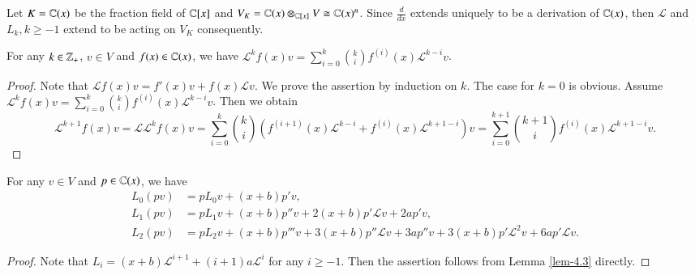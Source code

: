 \documentclass[12pt]{amsart}
\begin{document}
Let $K=\mathbb{C}(x)$ be the fraction field of $\mathbb{C}[x]$ and $V_K=\mathbb{C}(x)\otimes_{\mathbb{C}[x]} V\cong \mathbb{C}(x)^n$. Since $\frac{d}{dx}$ extends uniquely to be a derivation of $\mathbb{C}(x)$, then
$\mathcal{L}$ and $L_k, k\geq -1$ extend to be acting on $V_K$ consequently.%
\begin{lem}\label{lem-4.3}
For any $k\in\mathbb{Z}_+$, $v\in V$ and $f(x)\in \mathbb{C}(x)$, we have
$\mathcal{L}^kf(x)v=\sum_{i=0}^k \binom{k}{i}f^{(i)}(x)\mathcal{L}^{k-i}v$.
\end{lem}
\begin{proof}
Note that $\mathcal{L}f(x)v=f'(x)v+f(x)\mathcal{L}v$.
We prove the assertion by induction on $k$. The case for $k=0$ is obvious.
Assume $\mathcal{L}^kf(x)v=\sum_{i=0}^k \binom{k}{i}f^{(i)}(x)\mathcal{L}^{k-i}v$. Then we obtain $$\mathcal{L}^{k+1}f(x)v=\mathcal{L}\mathcal{L}^kf(x)v
=\sum_{i=0}^k \binom{k}{i}(f^{(i+1)}(x)\mathcal{L}^{k-i}+f^{(i)}(x)\mathcal{L}^{k+1-i})v
=\sum_{i=0}^{k+1} \binom{k+1}{i}f^{(i)}(x)\mathcal{L}^{k+1-i}v.$$
\end{proof}
\begin{lem}\label{lem-4.4-1}
For any $v\in V$ and $p\in \mathbb{C}(x)$, we have
\begin{align}
L_0(pv)&=pL_0v+(x+b)p' v,\label{eq-L0}\\
L_1(pv)&=pL_1v+(x+b)p'' v+2(x+b)p'\mathcal{L}v+2ap'v,\label{eq-L1}\\
L_2(pv)&=pL_2v+(x+b)p'''v+3(x+b)p''\mathcal{L}v+3ap''v+3(x+b)p'\mathcal{L}^2 v+6a p'\mathcal{L}v.\label{eq-L2}
\end{align}
\end{lem}
\begin{proof}Note that
$L_i=(x+b)\mathcal{L}^{i+1}+(i+1)a\mathcal{L}^i$ for any $i\geq -1$. Then the assertion follows from Lemma \ref{lem-4.3} directly.
\end{proof}
\end{document}
